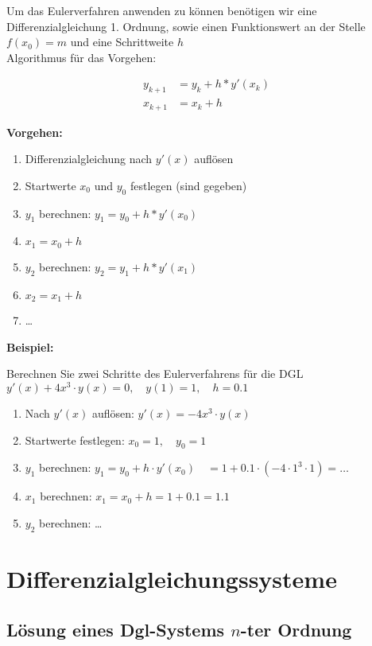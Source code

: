 \documentclass[12pt, a4paper]{scrreprt}
\begin{document}
Um das Eulerverfahren anwenden zu können benötigen wir eine Differenzialgleichung 1. Ordnung, sowie einen Funktionswert an der Stelle \(f(x_0) = m\) und eine Schrittweite \(h\)\\[1em]
Algorithmus für das Vorgehen:


\begin{align*}
  y_{k+1} &= y_k + h * y'(x_k)\\
  x_{k+1} &= x_k + h
\end{align*}



\textbf{Vorgehen:}
\begin{enumerate}
\item Differenzialgleichung nach \(y'(x)\) auflösen
\item Startwerte \(x_0\) und \(y_0\) festlegen (sind gegeben)
\item \(y_1\) berechnen: \(y_1 = y_0 + h * y'(x_0)\)
\item \(x_1 = x_0 + h\)
\item \(y_2\) berechnen: \(y_2 = y_1 + h * y'(x_1)\)
\item \(x_2 = x_1 + h\)
\item \dots
\end{enumerate}

\textbf{Beispiel:}

\glqq{} Berechnen Sie zwei Schritte des Eulerverfahrens für die DGL \(y'(x) + 4x^3 \cdot y(x) = 0, \quad y(1)= 1,\quad h = 0.1\) \grqq{}

\begin{enumerate}
\item Nach \(y'(x)\) auflösen: \(y'(x) = -4x^3 \cdot y(x)\)
\item Startwerte festlegen: \(x_0 = 1,\quad y_0 = 1\)
\item \(y_1\) berechnen: \(y_1 = y_0 + h \cdot y'(x_0) \quad = 1 + 0.1 \cdot (-4\cdot1^3 \cdot 1) = \dots\)
\item \(x_1\) berechnen: \(x_1 = x_0 + h = 1 + 0.1 = 1.1\)
\item \(y_2\) berechnen: \dots
\end{enumerate}

\section{Differenzialgleichungssysteme}

\subsection{Lösung eines Dgl-Systems \(n\)-ter Ordnung}
\end{document}
